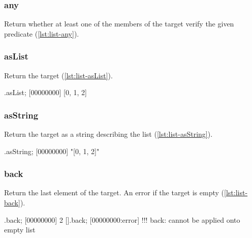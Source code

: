 \subsubsection{any}

Return whether at least one of the members of the target verify the
given predicate (\autoref{lst:list-any}).


\subsubsection{asList}

Return the target (\autoref{lst:list-asList}).

\begin{urbiscript}[caption=List.asList, label=lst:list-asList, float=\floatposh]
  [0, 1, 2].asList;
  [00000000] [0, 1, 2]
\end{urbiscript}

\subsubsection{asString}

Return the target as a string describing the list
(\autoref{lst:list-asString}).

\begin{urbiscript}[caption=List.asString, label=lst:list-asString, float=\floatposh]
  [0, 1, 2].asString;
  [00000000] "[0, 1, 2]"
\end{urbiscript}

\subsubsection{back}

Return the last element of the target. An error if the target is empty
(\autoref{lst:list-back}).

\begin{urbiscript}[caption=List.back, label=lst:list-back, float=\floatposh]
  [0, 1, 2].back;
  [00000000] 2
  [].back;
  [00000000:error] !!! back: cannot be applied onto empty list
\end{urbiscript}

